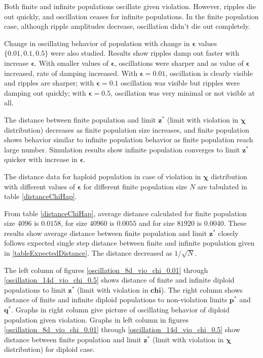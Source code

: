 Both finite and infinite populations oscillate given violation. However, ripples die out quickly, 
and oscillation ceases for infinite populations.
In the finite population case, although ripple amplitudes decrease, oscillation didn't die out completely. 

Change in oscillating behavior of population with change in $\bm{\epsilon}$ values $\{0.01, 0.1, 0.5\}$ were also studied. 
Results show ripples damp out faster with increase $\bm{\epsilon}$.
With smaller values of $\bm{\epsilon}$, oscillations were sharper and as value of $\bm{\epsilon}$ increased, 
rate of damping increased. With $\bm{\epsilon} = 0.01$, oscillation is clearly visible and ripples are sharper; with $\bm{\epsilon} = 0.1$ oscillation was visible 
but ripples were damping out quickly;  with $\bm{\epsilon} = 0.5$, oscillation was very minimal or not visible at all. 

The distance between finite population and limit $\bm{z}^\ast$ (limit with violation in $\bm{\chi}$ distribution) decreases as finite population size increases,
and finite population shows behavior similar to infinite population behavior as finite population reach large number. Simulation results show infinite population converges 
to limit $\bm{z^\ast}$ quicker with increase in $\bm{\epsilon}$. 

The distance data for haploid population in case of violation in $\bm{\chi}$ distribution 
with different values of $\bm{\epsilon}$ for different finite population size $N$ are tabulated in table \ref{distanceChiHap}.


From table \ref{distanceChiHap}, 
average distance calculated for finite population size $4096$ is $0.0158$, 
for size $40960$ is $0.0055$ and for size $81920$ is $0.0040$.
These results show average distance 
between finite population and limit $\bm{z^\ast}$ closely follows expected single step distance 
between finite and infinite population given in \ref{tableExpectedDistance}. The distance decreased as $1/\sqrt{N}$.


The left column of figures \ref{oscillation_8d_vio_chi_0.01} through \ref{oscillation_14d_vio_chi_0.5} 
shows distance of finite and infinite diploid populations to limit $\bm{z^\ast}$ (limit with violation in $\bm{chi}$). The 
right column shows distance of finite and infinite diploid populations to non-violation limits $\bm{p^\ast}$ and $\bm{q^\ast}$. 
Graphs in right column give picture of oscillating behavior of diploid population given violation. 
Graphs in left column in figures \ref{oscillation_8d_vio_chi_0.01} through \ref{oscillation_14d_vio_chi_0.5} show distance 
between finite population and limit $\bm{z}^\ast$ (limit with violation in $\bm{\chi}$ distribution) for diploid case.

